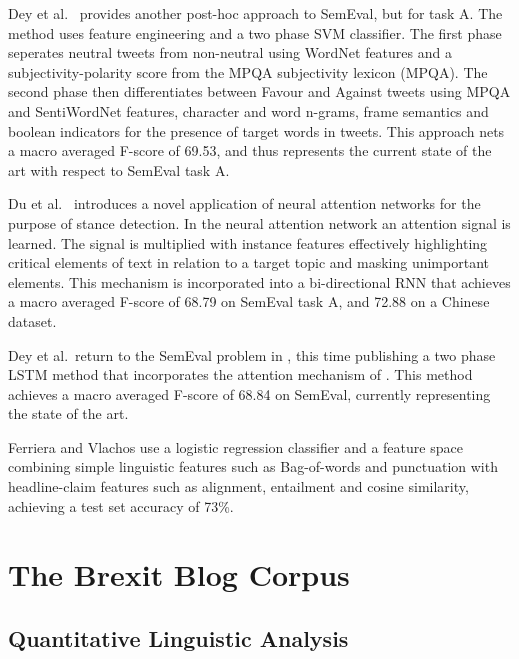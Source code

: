 \documentclass[Dissertation.tex]{subfiles}
\begin{document}
Dey et al.\ \cite{deyTwitterStanceDetection2017} provides another post-hoc approach to SemEval, but for task A. The method uses feature engineering and a two phase SVM classifier. The first phase seperates neutral tweets from non-neutral using WordNet \cite{WordNetLexicalDatabase} features and a subjectivity-polarity score from the MPQA subjectivity lexicon \cite{SubjectivityLexiconMPQA} (MPQA). The second phase then differentiates between Favour and Against tweets using MPQA and SentiWordNet \cite{SentiWordNet} features, character and word n-grams, frame semantics and boolean indicators for the presence of target words in tweets. This approach nets a macro averaged F-score of 69.53, and thus represents the current state of the art with respect to SemEval task A.

Du et al.\ \cite{duStanceClassificationTargetspecific} introduces a novel application of neural attention networks for the purpose of stance detection. In the neural attention network an attention signal is learned. The signal is multiplied with instance features effectively highlighting critical elements of text in relation to a target topic and masking unimportant elements. This mechanism is incorporated into a bi-directional RNN that achieves a macro averaged F-score of 68.79 on SemEval task A, and 72.88 on a Chinese dataset.

Dey et al.\ return to the SemEval problem in \cite{deyTopicalStanceDetection2018}, this time publishing a two phase LSTM method that incorporates the attention mechanism of \cite{duStanceClassificationTargetspecific}. This method achieves a macro averaged F-score of 68.84 on SemEval, currently representing the state of the art.

Ferriera and Vlachos use a logistic regression classifier and a feature space combining simple linguistic features such as Bag-of-words and punctuation with headline-claim features such as alignment, entailment and cosine similarity, achieving a test set accuracy of 73\%.



\section{The Brexit Blog Corpus}\label{BBC}
\subsection{Quantitative Linguistic Analysis}
\end{document}
